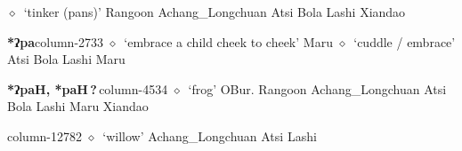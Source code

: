          $\diamond$~`tinker (pans)'
         Rangoon 
\hspace{1ex}
         Achang\_Longchuan 
\hspace{1ex}
         Atsi 
\hspace{1ex}
         Bola 
\hspace{1ex}
         Lashi 
\hspace{1ex}
         Xiandao 
  \item {\footnotesize \textbf{*ʔpa}}{\tiny column-2733}
         $\diamond$~`embrace a child cheek to cheek'
         Maru 
\hspace{1ex}
         $\diamond$~`cuddle / embrace'
         Atsi 
\hspace{1ex}
         Bola 
\hspace{1ex}
         Lashi 
\hspace{1ex}
         Maru 
  \item {\footnotesize \textbf{*ʔpaH, *paH\,?\,}}{\tiny column-4534}
         $\diamond$~`frog'
         OBur. 
\hspace{1ex}
         Rangoon 
\hspace{1ex}
         Achang\_Longchuan 
\hspace{1ex}
         Atsi 
\hspace{1ex}
         Bola 
\hspace{1ex}
         Lashi 
\hspace{1ex}
         Maru 
\hspace{1ex}
         Xiandao 
  \item {\footnotesize \textbf{}}{\tiny column-12782}
         $\diamond$~`willow'
         Achang\_Longchuan 
\hspace{1ex}
         Atsi 
\hspace{1ex}
         Lashi 
\hspace{1ex}
